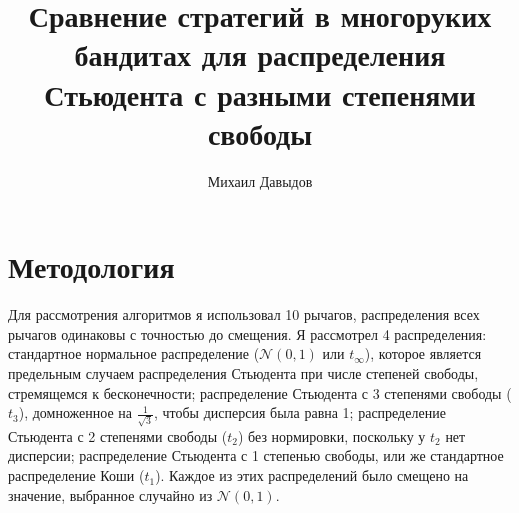 \documentclass{article}
\title{Сравнение стратегий в многоруких бандитах для распределения Стьюдента с разными степенями свободы}
\author{Михаил Давыдов}
\begin{document}
\maketitle

\section{Методология}

Для рассмотрения алгоритмов я использовал 10 рычагов, распределения всех рычагов одинаковы с точностью до смещения. Я рассмотрел 4 распределения: стандартное нормальное распределение ($\mathcal{N}(0,1)$ или $t_{\infty}$), которое является предельным случаем распределения Стьюдента при числе степеней свободы, стремящемся к бесконечности; распределение Стьюдента с 3 степенями свободы ($t_3$), домноженное на $\frac{1}{\sqrt{3}}$, чтобы дисперсия была равна 1; распределение Стьюдента с 2 степенями свободы ($t_2$) без нормировки, поскольку у $t_2$ нет дисперсии; распределение Стьюдента с 1 степенью свободы, или же стандартное распределение Коши ($t_1$). Каждое из этих распределений было смещено на значение, выбранное случайно из $\mathcal{N}(0,1)$.
\end{document}
